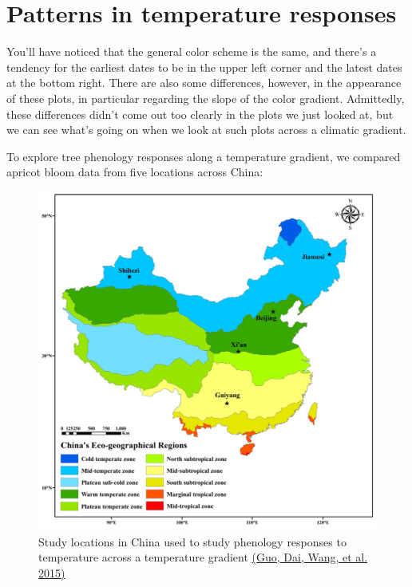 \documentclass[
]{book}
\begin{document}
\hypertarget{patterns-in-temperature-responses}{%
\section{Patterns in temperature responses}\label{patterns-in-temperature-responses}}

You'll have noticed that the general color scheme is the same, and there's a tendency for the earliest dates to be in the upper left corner and the latest dates at the bottom right. There are also some differences, however, in the appearance of these plots, in particular regarding the slope of the color gradient. Admittedly, these differences didn't come out too clearly in the plots we just looked at, but we can see what's going on when we look at such plots across a climatic gradient.

To explore tree phenology responses along a temperature gradient, we compared apricot bloom data from five locations across China:

\begin{figure}
\centering
\includegraphics{pictures/map_China.jpg}
\caption{Study locations in China used to study phenology responses to temperature across a temperature gradient \href{https://doi.org/10.1016/j.agrformet.2014.10.016}{(Guo, Dai, Wang, et al. \protect\hyperlink{ref-guo2015responses}{2015})}}
\end{figure}
\end{document}
